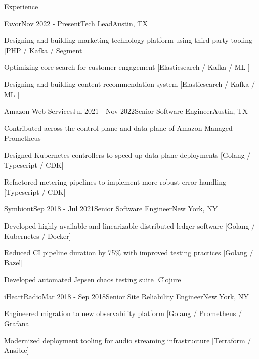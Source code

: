 \documentclass{resume} %
\begin{document}
\begin{rSection}{Experience}

\begin{rSubsection}{Favor}{Nov 2022 - Present}{Tech Lead}{Austin, TX}
\item Designing and building marketing technology platform using third party tooling {\footnotesize [PHP / Kafka / Segment]}
\item Optimizing core search for customer engagement {\footnotesize [Elasticsearch / Kafka / ML ]}
\item Designing and building content recommendation system {\footnotesize [Elasticsearch / Kafka / ML ]}

\end{rSubsection}

\begin{rSubsection}{Amazon Web Services}{Jul 2021 - Nov 2022}{Senior Software Engineer}{Austin, TX}
\item Contributed across the control plane and data plane of Amazon Managed Prometheus
\item Designed Kubernetes controllers to speed up data plane deployments {\footnotesize [Golang / Typescript / CDK]}
\item Refactored metering pipelines to implement more robust error handling {\footnotesize [Typescript / CDK]}

\end{rSubsection}

\begin{rSubsection}{Symbiont}{Sep 2018 - Jul 2021}{Senior Software Engineer}{New York, NY}
\item Developed highly available and linearizable distributed ledger software {\footnotesize [Golang / Kubernetes / Docker]}
\item Reduced CI pipeline duration by 75\% with improved testing practices {\footnotesize [Golang / Bazel]}
\item Developed automated Jepsen chaos testing suite {\footnotesize [Clojure]}

\end{rSubsection}


\begin{rSubsection}{iHeartRadio}{Mar 2018 - Sep 2018}{Senior Site Reliability Engineer}{New York, NY}
\item Engineered migration to new observability platform {\footnotesize [Golang / Prometheus / Grafana]}
\item Modernized deployment tooling for audio streaming infrastructure {\footnotesize [Terraform / Ansible]}


\end{rSubsection}
\end{rSection}
\end{document}
